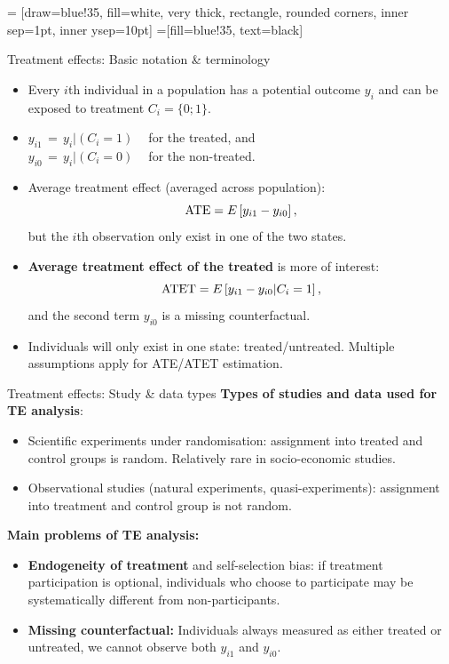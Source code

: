 \documentclass{beamer}
\begin{document}
 = [draw=blue!35, fill=white, very thick,
    rectangle, rounded corners, inner sep=1pt, inner ysep=10pt]
 =[fill=blue!35, text=black]
\begin{frame}{Treatment effects: Basic notation \& terminology}
\begin{itemize}
    \item Every $i$th individual in a population has a potential outcome $y_i$ and can be exposed to treatment $C_i=\{0;1\}$. 
    \medskip
    \item $y_{i1} \, = \, y_i | (C_i = 1)~~~~$ for the treated, and \\
    $y_{i0} \, = \, y_i | (C_i = 0)~~~~$ for the non-treated.
    \medskip
    \item Average treatment effect (averaged across population):
    $$\textnormal{ATE} = E \left[ y_{i1}-y_{i0}\right],$$
    but the $i$th observation only exist in one of the two states.
    \medskip
    \item \textbf{Average treatment effect of the treated} is more of interest:
    $$\textnormal{ATET} = E \left[ y_{i1}-y_{i0} | C_i = 1\right],$$
    and the second term $y_{i0}$ is a missing counterfactual. 
    \medskip
    \item Individuals will only exist in one state: treated/untreated. Multiple assumptions apply for ATE/ATET estimation.
\end{itemize}  
\end{frame}
\begin{frame}{Treatment effects: Study \& data types}
\textbf{Types of studies and data used for TE analysis}:\\
\begin{itemize}
    \item Scientific experiments under randomisation: assignment into treated and control groups is random. Relatively rare in socio-economic studies. 
    \medskip
    \item Observational studies (natural experiments, quasi-experiments): assignment into treatment and control group is not random. \\ \medskip
\end{itemize}
\bigskip
\textbf{Main problems of TE analysis:}
\begin{itemize}
    \item \textbf{Endogeneity of treatment} and self-selection bias: if treatment participation is optional, individuals who choose to participate may be systematically different from non-participants.
    \medskip
    \item \textbf{Missing counterfactual:}  Individuals always measured as either treated or untreated, we cannot observe both $y_{i1}$ and $y_{i0}$.
\end{itemize}
    

\end{frame}
\end{document}
